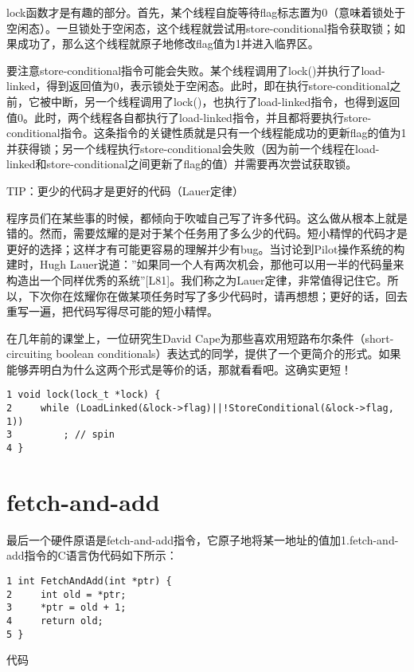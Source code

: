 lock函数才是有趣的部分。首先，某个线程自旋等待flag标志置为0（意味着锁处于空闲态）。一旦锁处于空闲态，这个线程就尝试用store-conditional指令获取锁；如果成功了，那么这个线程就原子地修改flag值为1并进入临界区。

要注意store-conditional指令可能会失败。某个线程调用了lock()并执行了load-linked，得到返回值为0，表示锁处于空闲态。此时，即在执行store-conditional之前，它被中断，另一个线程调用了lock()，也执行了load-linked指令，也得到返回值0。此时，两个线程各自都执行了load-linked指令，并且都将要执行store-conditional指令。这条指令的关键性质就是只有一个线程能成功的更新flag的值为1并获得锁；另一个线程执行store-conditional会失败（因为前一个线程在load-linked和store-conditional之间更新了flag的值）并需要再次尝试获取锁。

\begin{tcolorbox}[colframe=grey,colback= grey,arc=0pt,left=6pt,right=6pt,top=6pt,bottom=6pt,boxsep=0pt]
\begin{center}TIP：更少的代码才是更好的代码（Lauer定律）\end{center}
程序员们在某些事的时候，都倾向于吹嘘自己写了许多代码。这么做从根本上就是错的。然而，需要炫耀的是对于某个任务用了多么少的代码。短小精悍的代码才是更好的选择；这样才有可能更容易的理解并少有bug。当讨论到Pilot操作系统的构建时，Hugh Lauer说道：”如果同一个人有两次机会，那他可以用一半的代码量来构造出一个同样优秀的系统”[L81]。我们称之为Lauer定律，非常值得记住它。所以，下次你在炫耀你在做某项任务时写了多少代码时，请再想想；更好的话，回去重写一遍，把代码写得尽可能的短小精悍。
\end{tcolorbox}

在几年前的课堂上，一位研究生David Cape为那些喜欢用短路布尔条件（short-circuiting boolean conditionals）表达式的同学，提供了一个更简介的形式。如果能够弄明白为什么这两个形式是等价的话，那就看看吧。这确实更短！

\begin{verbatim}
1 void lock(lock_t *lock) {
2     while (LoadLinked(&lock->flag)||!StoreConditional(&lock->flag, 1))
3         ; // spin
4 }
\end{verbatim}

\section{fetch-and-add}
最后一个硬件原语是fetch-and-add指令，它原子地将某一地址的值加1.fetch-and-add指令的C语言伪代码如下所示：

\begin{verbatim}
1 int FetchAndAdd(int *ptr) {
2     int old = *ptr;
3     *ptr = old + 1;
4     return old;
5 }
\end{verbatim}
代码

